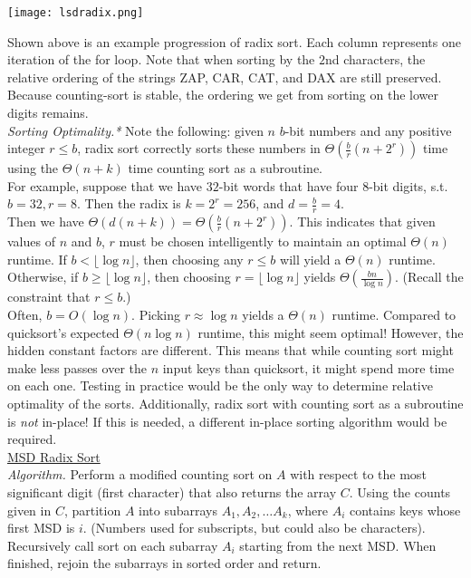 \documentclass[12pt, fleqn]{general}
\begin{document}
\begin{multicols*}{2}
    \begin{center}
    \texttt{[image: lsdradix.png]}
    \end{center}

    Shown above is an example progression of radix sort. Each column represents one iteration of the for loop. Note that when sorting by the $2$nd characters, the relative ordering of the strings ZAP, CAR, CAT, and DAX are still preserved. Because counting-sort is stable, the ordering we get from sorting on the lower digits remains.\\

    \emph{Sorting Optimality.*} Note the following: given $n$ $b$-bit numbers and any positive integer $r \leq b$, radix sort correctly sorts these numbers in $\Theta(\frac{b}{r}(n+2^r))$ time using the $\Theta(n + k)$ time counting sort as a subroutine.\\
    
    For example, suppose that we have $32$-bit words that have four $8$-bit digits, s.t. $b = 32, r = 8$. Then the radix is $k = 2^r = 256$, and $d = \frac{b}{r} = 4$.\\

    Then we have $\Theta(d(n+k)) = \Theta(\frac{b}{r}(n+2^r))$. This indicates that given values of $n$ and $b$, $r$ must be chosen intelligently to maintain an optimal $\Theta(n)$ runtime. If $b < \lfloor \log n \rfloor$, then choosing any $ r \leq b$ will yield a $\Theta(n)$ runtime. Otherwise, if $b \geq \lfloor \log n \rfloor$, then choosing $r = \lfloor \log n \rfloor$ yields $\Theta(\frac{bn}{\log n})$. (Recall the constraint that $r \leq b$.)\\

    Often, $b = O(\log n)$. Picking $r \approx \log n$ yields a $\Theta(n)$ runtime. Compared to quicksort's expected $\Theta(n\log n)$ runtime, this might seem optimal! However, the hidden constant factors are different. This means that while counting sort might make less passes over the $n$ input keys than quicksort, it might spend more time on each one. Testing in practice would be the only way to determine relative optimality of the sorts. Additionally, radix sort with counting sort
    as a subroutine is \emph{not} in-place! If this is needed, a different in-place sorting algorithm would be required.\\

    \underline{MSD Radix Sort}\\

    \emph{Algorithm.} Perform a modified counting sort on $A$ with respect to the most significant digit (first character) that also returns the array $C$. Using the counts given in $C$, partition $A$ into subarrays $A_1, A_2, \dots A_k$, where $A_i$ contains keys whose first MSD is $i$. (Numbers used for subscripts, but could also be characters). Recursively call sort on each subarray $A_i$ starting from the next MSD. When finished, rejoin the subarrays in sorted order and
    return.\\


\end{multicols*}
\end{document}
